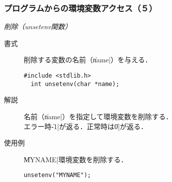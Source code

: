 \documentclass{beamer}                 %
\begin{document}
\begin{frame}[fragile]
  \frametitle{プログラムからの環境変数アクセス（５）}
  \emph{削除（unsetenv関数）}
  \begin{description}
  \item [書式] 削除する変数の名前（\|name|）を与える．
\begin{lstlisting}[numbers=none]
  #include <stdlib.h>
  int unsetenv(char *name);
\end{lstlisting}
  \item [解説] 名前（\|name|）を指定して環境変数を削除する．\\
    エラー時\|-1|が返る．正常時は\|0|が返る．
  \item [使用例] \|MYNAME|環境変数を削除する．
\begin{lstlisting}[numbers=none]
  unsetenv("MYNAME");
\end{lstlisting}
  \end{description}
  \vfill
\end{frame}
\end{document}
